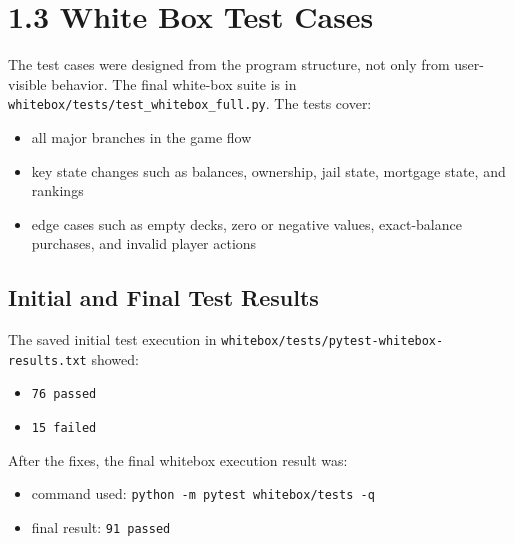 \documentclass[12pt]{article}
\begin{document}
\section{1.3 White Box Test Cases}
The test cases were designed from the program structure, not only from user-visible behavior. The final white-box suite is in \texttt{whitebox/tests/test\_whitebox\_full.py}. The tests cover:
\begin{itemize}
\item all major branches in the game flow
\item key state changes such as balances, ownership, jail state, mortgage state, and rankings
\item edge cases such as empty decks, zero or negative values, exact-balance purchases, and invalid player actions
\end{itemize}

\subsection{Initial and Final Test Results}
The saved initial test execution in \texttt{whitebox/tests/pytest-whitebox-results.txt} showed:
\begin{itemize}
\item \texttt{76 passed}
\item \texttt{15 failed}
\end{itemize}

After the fixes, the final whitebox execution result was:
\begin{itemize}
\item command used: \texttt{python -m pytest whitebox/tests -q}
\item final result: \texttt{91 passed}
\end{itemize}
\end{document}
